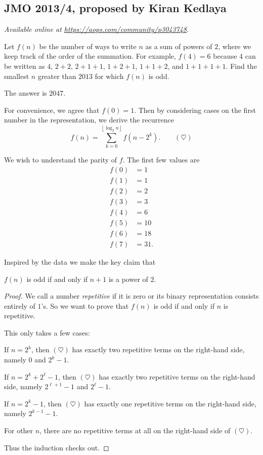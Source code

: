 \documentclass[11pt]{scrartcl}
\begin{document}
\subsection{JMO 2013/4, proposed by Kiran Kedlaya}
\textsl{Available online at \url{https://aops.com/community/p3043748}.}
\begin{mdframed}[style=mdpurplebox,frametitle={Problem statement}]
Let $f(n)$ be the number of ways to write $n$ as a sum of powers of $2$,
where we keep track of the order of the summation.
For example, $f(4)=6$ because $4$ can be written
as $4$, $2+2$, $2+1+1$, $1+2+1$, $1+1+2$, and $1+1+1+1$.
Find the smallest $n$ greater than $2013$ for which $f(n)$ is odd.
\end{mdframed}
The answer is $2047$.

For convenience, we agree that $f(0) = 1$.
Then by considering cases on the first number in the representation,
we derive the recurrence
\[ f(n) = \sum_{k=0}^{\left\lfloor \log_2 n \right\rfloor} f(n-2^k).
  \qquad (\heartsuit) \]

We wish to understand the parity of $f$. The first few values are
\begin{align*}
  f(0) &= 1 \\
  f(1) &= 1 \\
  f(2) &= 2 \\
  f(3) &= 3 \\
  f(4) &= 6 \\
  f(5) &= 10 \\
  f(6) &= 18 \\
  f(7) &= 31.
\end{align*}

Inspired by the data we make the key claim that
\begin{claim*}
  $f(n)$ is odd if and only if $n+1$ is a power of $2$.
\end{claim*}
\begin{proof}
  We call a number \emph{repetitive} if it is zero or its binary representation
  consists entirely of $1$'s.
  So we want to prove that $f(n)$ is odd if and only if $n$ is repetitive.

  This only takes a few cases:
  \begin{itemize}
  \ii If $n = 2^k$, then $(\heartsuit)$
  has exactly two repetitive terms on the right-hand side, namely $0$ and $2^k-1$.

  \ii If $n = 2^k + 2^\ell - 1$, then $(\heartsuit)$
  has exactly two repetitive terms on the right-hand side,
  namely $2^{\ell+1}-1$ and $2^{\ell}-1$.

  \ii If $n = 2^k-1$, then $(\heartsuit)$
  has exactly one repetitive terms on the right-hand side, namely $2^{k-1}-1$.

  \ii For other $n$,
  there are no repetitive terms at all on the right-hand side of $(\heartsuit)$.
  \end{itemize}
  Thus the induction checks out.
\end{proof}
\end{document}
